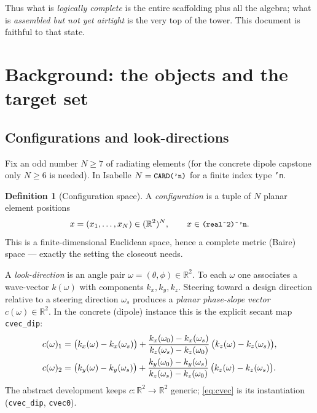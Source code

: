 \documentclass[11pt]{article}
\theoremstyle{plain}
\theoremstyle{definition}
\newtheorem{definition}[theorem]{Definition}
\theoremstyle{remark}
\newcommand{\RR}{\mathbb{R}}
\newcommand{\cvec}{c}                 %
\newcommand{\code}[1]{\texttt{\small #1}}
\begin{document}
Thus what is \emph{logically complete} is the entire scaffolding plus all the
algebra; what is \emph{assembled but not yet airtight} is the very top of the
tower.  This document is faithful to that state.

\section{Background: the objects and the target set}\label{sec:setup}

\subsection{Configurations and look-directions}

Fix an odd number $N\ge 7$ of radiating elements (for the concrete dipole
capstone only $N\ge 6$ is needed).  In Isabelle $N=\code{CARD('n)}$ for a finite
index type \code{'n}.

\begin{definition}[Configuration space]
A \emph{configuration} is a tuple of $N$ planar element positions
\[
  x=(x_1,\dots,x_N)\in(\RR^2)^N,\qquad x\in\code{(real\^{}2)\^{}'n}.
\]
This is a finite-dimensional Euclidean space, hence a complete metric (Baire)
space --- exactly the setting the closeout needs.
\end{definition}

A \emph{look-direction} is an angle pair $\omega=(\theta,\phi)\in\RR^2$.  To each
$\omega$ one associates a wave-vector $k(\omega)$ with components
$k_x,k_y,k_z$.  Steering toward a design direction relative to a steering
direction $\omega_s$ produces a \emph{planar phase-slope vector}
$\cvec(\omega)\in\RR^2$.  In the concrete (dipole) instance this is the explicit
secant map \code{cvec\_dip}:
\begin{align}
  \cvec(\omega)_1 &= \big(k_x(\omega)-k_x(\omega_s)\big)
      + \frac{k_x(\omega_0)-k_x(\omega_s)}{k_z(\omega_s)-k_z(\omega_0)}\,
        \big(k_z(\omega)-k_z(\omega_s)\big),\notag\\
  \cvec(\omega)_2 &= \big(k_y(\omega)-k_y(\omega_s)\big)
      + \frac{k_y(\omega_0)-k_y(\omega_s)}{k_z(\omega_s)-k_z(\omega_0)}\,
        \big(k_z(\omega)-k_z(\omega_s)\big).
  \label{eq:cvec}
\end{align}
The abstract development keeps $\cvec:\RR^2\to\RR^2$ generic;
\eqref{eq:cvec} is its instantiation (\code{cvec\_dip}, \code{cvec0}).
\end{document}
